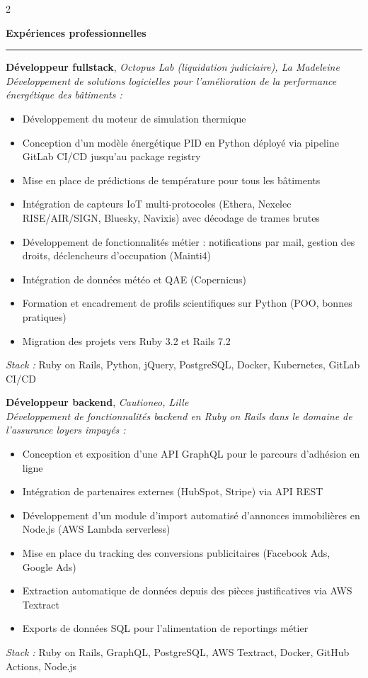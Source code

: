 \documentclass[a4paper,10pt]{article}
\newcommand{\rsection}[1]{%
  \vspace{4pt}%
  {\color{accent}\large\bfseries #1}%
  \par\vspace{-4pt}%
  {\color{accent}\rule{\linewidth}{1pt}}%
  \vspace{2pt}%
}
\newcommand{\cventry}[4]{%
  \vspace{3pt}\noindent
  \makebox[1.8cm][l]{\small\color{gray}#1}\hspace{6pt}%
  \begin{minipage}[t]{\dimexpr\linewidth-2.2cm}
    {\bfseries #2}, \small\itshape #3\\[2pt]
    \small\upshape #4
  \end{minipage}
  \vspace{3pt}%
}
\begin{document}
\begin{paracol}{2}
\begin{rightcolumn}
\begin{minipage}[t]{\dimexpr\linewidth-19pt}
\vspace{6pt}

\rsection{\faBuilding\enspace Expériences professionnelles}

\cventry{2023 -- 2026}{Développeur fullstack}{Octopus Lab (liquidation judiciaire), La Madeleine}
  {Développement de solutions logicielles pour l'amélioration de la performance énergétique des bâtiments :
  \begin{itemize}[leftmargin=10pt, itemsep=0pt, topsep=2pt, parsep=0pt, label={\tiny\textbullet}]
    \item Développement du moteur de simulation thermique
    \item Conception d'un modèle énergétique PID en Python déployé via pipeline GitLab CI/CD jusqu'au package registry
    \item Mise en place de prédictions de température pour tous les bâtiments
    \item Intégration de capteurs IoT multi-protocoles (Ethera, Nexelec RISE/AIR/SIGN, Bluesky, Navixis) avec décodage de trames brutes
    \item Développement de fonctionnalités métier : notifications par mail, gestion des droits, déclencheurs d'occupation (Mainti4)
    \item Intégration de données météo et QAE (Copernicus)
    \item Formation et encadrement de profils scientifiques sur Python (POO, bonnes pratiques)
    \item Migration des projets vers Ruby 3.2 et Rails 7.2
  \end{itemize}
  \textit{Stack :} Ruby on Rails, Python, jQuery, PostgreSQL, Docker, Kubernetes, GitLab CI/CD
  }

\cventry{2022 -- 2023}{Développeur backend}{Cautioneo, Lille}
  {Développement de fonctionnalités backend en Ruby on Rails dans le domaine de l'assurance loyers impayés :
  \begin{itemize}[leftmargin=10pt, itemsep=0pt, topsep=2pt, parsep=0pt, label={\tiny\textbullet}]
    \item Conception et exposition d'une API GraphQL pour le parcours d'adhésion en ligne
    \item Intégration de partenaires externes (HubSpot, Stripe) via API REST
    \item Développement d'un module d'import automatisé d'annonces immobilières en Node.js (AWS Lambda serverless)
    \item Mise en place du tracking des conversions publicitaires (Facebook Ads, Google Ads)
    \item Extraction automatique de données depuis des pièces justificatives via AWS Textract
    \item Exports de données SQL pour l'alimentation de reportings métier
  \end{itemize}
  \textit{Stack :} Ruby on Rails, GraphQL, PostgreSQL, AWS Textract, Docker, GitHub Actions, Node.js
  }


\end{minipage}
\end{rightcolumn}
\end{paracol}
\end{document}
